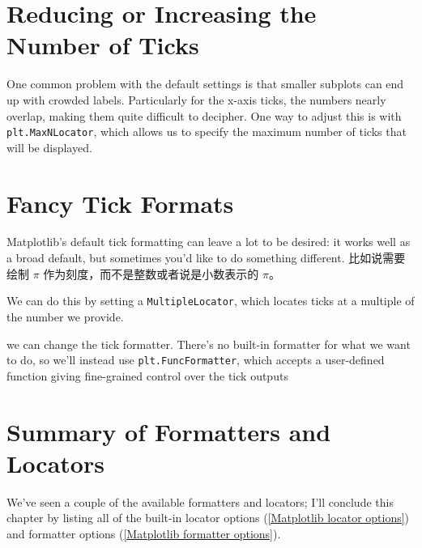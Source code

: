 \section{Reducing or Increasing the Number of Ticks}
One common problem with the default settings is that smaller subplots can end up
with crowded labels. Particularly for the x-axis ticks, the numbers nearly overlap, making them quite difficult to decipher. One way to adjust this is with \verb|plt.MaxNLocator|, which allows us to
specify the maximum number of ticks that will be displayed.

\section{Fancy Tick Formats}
Matplotlib's default tick formatting can leave a lot to be desired: it works well as a
broad default, but sometimes you'd like to do something different. 比如说需要绘制 $\pi$ 作为刻度，而不是整数或者说是小数表示的 $\pi$。

We can do this by setting a
\verb|MultipleLocator|, which locates ticks at a multiple of the number we provide.

we can change the tick formatter. There's no built-in formatter for what we want to do, so
we'll instead use \verb|plt.FuncFormatter|, which accepts a user-defined function giving
fine-grained control over the tick outputs

\section{Summary of Formatters and Locators}
We've seen a couple of the available formatters and locators; I'll conclude this chapter
by listing all of the built-in locator options (\autoref{Matplotlib locator options}) and formatter options
(\autoref{Matplotlib formatter options}).

